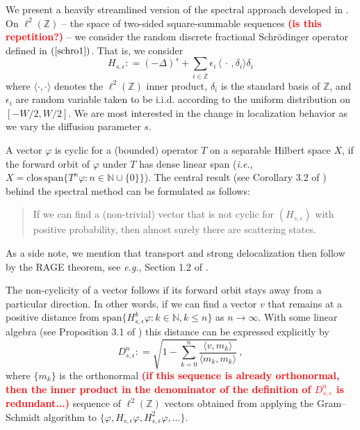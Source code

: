 \documentclass[final,1p,times]{elsarticle}
\def\NN{\mathbb N} %
\def\ZZ{\mathbb Z} %
\newcommand{\bb}[1]{\begin{equation}\label{#1}}
\newcommand{\ee}{\end{equation}}
\def\R#1{$(\ref{#1})$}
\theoremstyle{remark}
\theoremstyle{definition}
\newcommand{\josh}[1]{\textcolor{red}{\textbf{#1}}}
\begin{document}
We present a heavily streamlined version of the spectral approach developed in \cite{Liaw2013}. On $\ell^2(\ZZ)$ -- the space of two-sided  square-summable sequences \josh{(is this repetition?)} -- we consider the random discrete fractional Schr{\"o}dinger operator defined in \R{schro1}. That is, we consider
$$
H_{s,\epsilon} \mathrel{\mathop:}= (-\Delta)^s + \sum_{i\in\ZZ}\epsilon_i\,\langle \,\cdot\,,\delta_i\rangle \delta_i
$$
where $\langle \cdot, \cdot\rangle$ denotes the $\ell^2 (\ZZ)$ inner product, $\delta_i$ is the standard basis of $\ZZ$, and $\epsilon_i$ are random variable taken to be i.i.d. according to the uniform distribution on $[-W/2,W/2]$. We are most interested in the change in localization behavior as we vary the diffusion parameter $s$.

A vector $\varphi$ is cyclic for a (bounded) operator $T$ on a separable Hilbert space $X$, if the forward orbit of $\varphi$ under $T$ has dense linear span ({\em i.e.}, $X = \text{clos}\,\text{span}\{T^n \varphi:n\in \NN\cup\{0\}\}$).
The central result (see Corollary 3.2 of \cite{Liaw2013}) behind the spectral method can be formulated as follows:
\begin{quote}
If we can find a (non-trivial) vector that is not cyclic for $(H_{s,\epsilon})$ with positive probability, then almost surely there are scattering states. 
\end{quote}
As a side note, we mention that transport and strong delocalization then follow by the RAGE theorem, see {\em e.g.}, Section 1.2 of \cite{MR2603225}.

The non-cyclicity of a vector follows if its forward orbit stays away from a particular direction. In other words, if we can find a vector $v$ that remains at a positive distance from $\text{span}\{H_{s,\epsilon}^k \varphi:k\in \NN, k\le n\}$ as $n\to\infty$. With some linear algebra (see Proposition 3.1 of \cite{Liaw2013}) this distance can be expressed explicitly by
\[
D_{s,\epsilon}^n\mathrel{\mathop:}=\sqrt{1-\sum_{k=0}^n\frac{\langle v, m_k\rangle}{\langle m_k, m_k\rangle}}\,,
\]
where $\{m_k\}$ is the orthonormal \josh{(if this sequence is already orthonormal, then the inner product in the denominator of the definition of $D_{s,\varepsilon}^n$ is redundant...)} sequence of $\ell^2(\ZZ)$ vectors obtained from applying the Gram--Schmidt algorithm to $\{\varphi, H_{s,\epsilon} \varphi, H^2_{s,\epsilon} \varphi, \hdots\}$.
\end{document}
